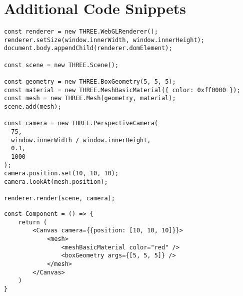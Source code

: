 \chapter{Additional Code Snippets} 

\begin{lstlisting}[caption={~Creating and displaying a 3D red cube with Three.js},label={lst:threejs},captionpos=t,float,abovecaptionskip=-\medskipamount,belowcaptionskip=\medskipamount]
const renderer = new THREE.WebGLRenderer();
renderer.setSize(window.innerWidth, window.innerHeight);
document.body.appendChild(renderer.domElement);

const scene = new THREE.Scene();

const geometry = new THREE.BoxGeometry(5, 5, 5);
const material = new THREE.MeshBasicMaterial({ color: 0xff0000 });
const mesh = new THREE.Mesh(geometry, material);
scene.add(mesh);

const camera = new THREE.PerspectiveCamera(
  75,
  window.innerWidth / window.innerHeight,
  0.1,
  1000
);
camera.position.set(10, 10, 10);
camera.lookAt(mesh.position);

renderer.render(scene, camera);

\end{lstlisting}


\begin{lstlisting}[caption={~Creating a 3D red cube as a React component with R3F},label={lst:r3f},captionpos=t,float,abovecaptionskip=-\medskipamount,belowcaptionskip=\medskipamount]
const Component = () => {
    return (
        <Canvas camera={{position: [10, 10, 10]}}>
            <mesh>
                <meshBasicMaterial color="red" />
                <boxGeometry args={[5, 5, 5]} />
            </mesh>
        </Canvas>
    )
}
\end{lstlisting}
